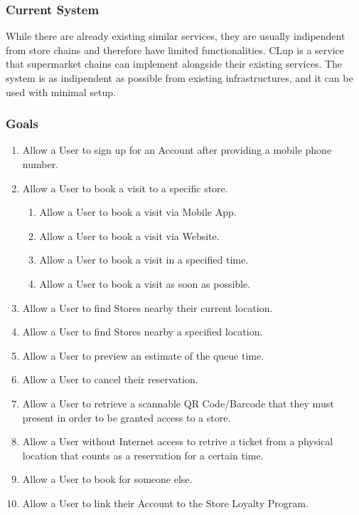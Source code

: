 \subsubsection{Current System}
While there are already existing similar services, they are usually indipendent from store chains and
therefore have limited functionalities. CLup is a service that supermarket chains can implement alongside
their existing services. The system is as indipendent as possible from existing infrastructures, and
it can be used with minimal setup.

\subsubsection{Goals}
\begin{enumerate}
    \item Allow a User to sign up for an Account after providing a mobile phone number.
    \item Allow a User to book a visit to a specific store.
        \begin{enumerate}
            \item Allow a User to book a visit via Mobile App.
            \item Allow a User to book a visit via Website.
            \item Allow a User to book a visit in a specified time.
            \item Allow a User to book a visit as soon as possible.
        \end{enumerate}
    \item Allow a User to find Stores nearby their current location.
    \item Allow a User to find Stores nearby a specified location.
    \item Allow a User to preview an estimate of the queue time.
    \item Allow a User to cancel their reservation.
    \item Allow a User to retrieve a scannable QR Code/Barcode that they must present in order to be granted access to a store.
    \item Allow a User without Internet access to retrive a ticket from a physical location that counts as a reservation for a certain time.
    \item Allow a User to book for someone else.
    \item Allow a User to link their Account to the Store Loyalty Program.
        \begin{enumerate}

\end{enumerate}
\end{enumerate}
